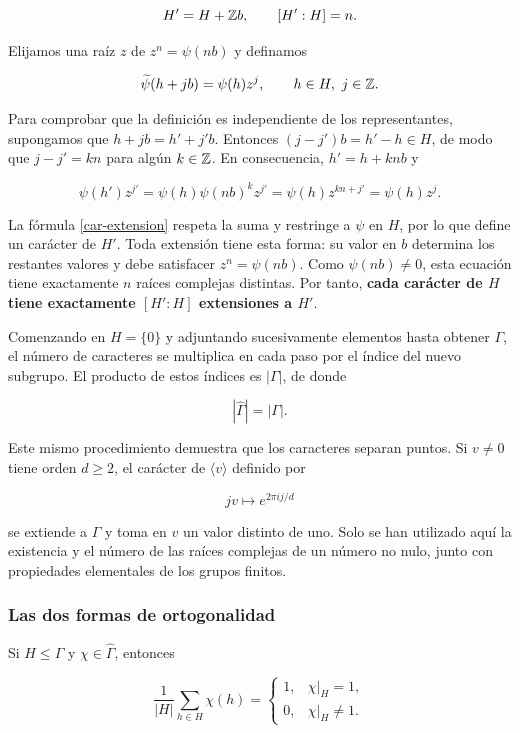 \[
H'=H+\mathbb{Z} b,\qquad [H':H]=n.
\]

Elijamos una raíz $z$ de $z^n=\psi(nb)$ y definamos

\begin{equation}
\widetilde\psi(h+jb)=\psi(h)z^j,
\qquad h\in H,\ j\in\mathbb{Z}.
\label{car-extension}
\end{equation}

Para comprobar que la definición es independiente de los representantes, supongamos que $h+jb=h'+j'b$. Entonces $(j-j')b=h'-h\in H$, de modo que $j-j'=kn$ para algún $k\in\mathbb{Z}$. En consecuencia, $h'=h+knb$ y

\[
\psi(h')z^{j'}
=\psi(h)\psi(nb)^kz^{j'}
=\psi(h)z^{kn+j'}
=\psi(h)z^j.
\]

La fórmula \eqref{car-extension} respeta la suma y restringe a $\psi$ en $H$, por lo que define un carácter de $H'$. Toda extensión tiene esta forma: su valor en $b$ determina los restantes valores y debe satisfacer $z^n=\psi(nb)$. Como $\psi(nb)\ne0$, esta ecuación tiene exactamente $n$ raíces complejas distintas. Por tanto, \textbf{cada carácter de $H$ tiene exactamente $[H':H]$ extensiones a $H'$}.

Comenzando en $H=\{0\}$ y adjuntando sucesivamente elementos hasta obtener $\Gamma$, el número de caracteres se multiplica en cada paso por el índice del nuevo subgrupo. El producto de estos índices es $|\Gamma|$, de donde

\begin{equation}
|\widehat\Gamma|=|\Gamma|.
\label{car-cardinal-dual}
\end{equation}

Este mismo procedimiento demuestra que los caracteres separan puntos. Si $v\ne0$ tiene orden $d\ge2$, el carácter de $\langle v\rangle$ definido por

\[
jv\longmapsto e^{2\pi i j/d}
\]

se extiende a $\Gamma$ y toma en $v$ un valor distinto de uno. Solo se han utilizado aquí la existencia y el número de las raíces complejas de un número no nulo, junto con propiedades elementales de los grupos finitos.

\subsubsection*{Las dos formas de ortogonalidad}

Si $H\le\Gamma$ y $\chi\in\widehat\Gamma$, entonces

\begin{equation}
\frac1{|H|}\sum_{h\in H}\chi(h)
=
\begin{cases}
1,&\chi|_H=1,\\
0,&\chi|_H\ne1.
\end{cases}
\label{car-ortogonalidad-subgrupo}
\end{equation}

